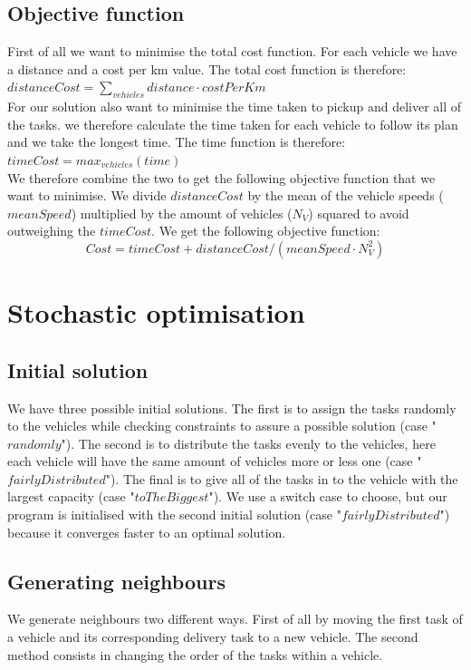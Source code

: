 \documentclass[11pt]{article}
\begin{document}
\subsection{Objective function}
First of all we want to minimise the total cost function. For each vehicle we have a distance and a cost per km value. The total cost function is therefore:
$distanceCost = \sum_{vehicles}^{} distance \cdot costPerKm$ \\

\noindent \noindent For our solution also want to minimise the time taken to pickup and deliver all of the tasks. we therefore calculate the time taken for each vehicle to follow its plan and we take the longest time. The time function is therefore: $timeCost = max_{vehicles}(time)$ \\

\pagebreak
\noindent \noindent We therefore combine the two to get the following objective function that we want to minimise. We divide $distanceCost$ by the mean of the vehicle speeds ($meanSpeed$) multiplied by the amount of vehicles ($N_V$) squared to avoid outweighing the $timeCost$. We get the following objective function:
$$Cost = timeCost + distanceCost/(meanSpeed \cdot N_V^2)$$

\section{Stochastic optimisation}

\subsection{Initial solution}
We have three possible initial solutions. The first is to assign the tasks randomly to the vehicles while checking constraints to assure a possible solution (case "$randomly$"). The second is to distribute the tasks evenly to the vehicles, here each vehicle will have the same amount of vehicles more or less one (case "$fairlyDistributed$"). The final is to give all of the tasks in to the vehicle with the largest capacity (case "$toTheBiggest$"). We use a switch case to choose, but our program is initialised with the second initial solution (case "$fairlyDistributed$") because it converges faster to an optimal solution.

\subsection{Generating neighbours}
We generate neighbours two different ways. First of all by moving the first task of a vehicle and its corresponding delivery task to a new vehicle. The second method consists in changing the order of the tasks within a vehicle.
\end{document}
